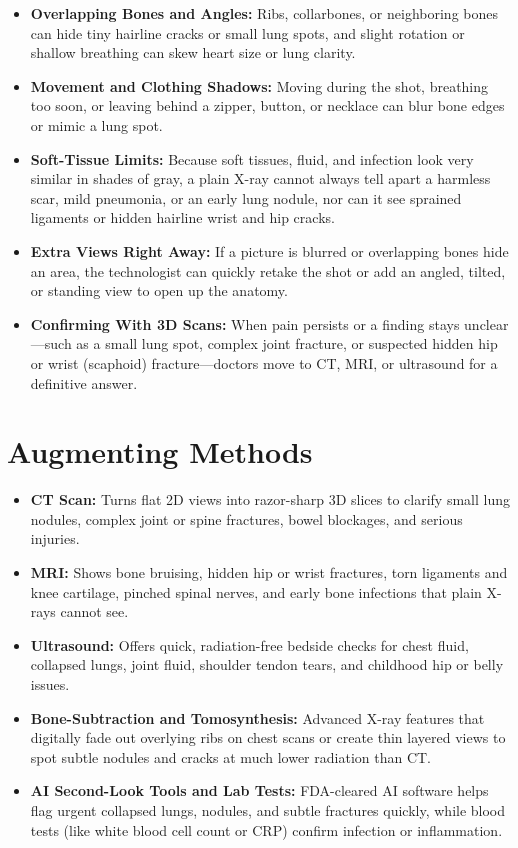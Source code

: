 \begin{itemize}
    \item \textbf{Overlapping Bones and Angles:} Ribs, collarbones, or neighboring bones can hide tiny hairline cracks or small lung spots, and slight rotation or shallow breathing can skew heart size or lung clarity.
    \item \textbf{Movement and Clothing Shadows:} Moving during the shot, breathing too soon, or leaving behind a zipper, button, or necklace can blur bone edges or mimic a lung spot.
    \item \textbf{Soft-Tissue Limits:} Because soft tissues, fluid, and infection look very similar in shades of gray, a plain X-ray cannot always tell apart a harmless scar, mild pneumonia, or an early lung nodule, nor can it see sprained ligaments or hidden hairline wrist and hip cracks.
    \item \textbf{Extra Views Right Away:} If a picture is blurred or overlapping bones hide an area, the technologist can quickly retake the shot or add an angled, tilted, or standing view to open up the anatomy.
    \item \textbf{Confirming With 3D Scans:} When pain persists or a finding stays unclear---such as a small lung spot, complex joint fracture, or suspected hidden hip or wrist (scaphoid) fracture---doctors move to CT, MRI, or ultrasound for a definitive answer.
\end{itemize}

\section{Augmenting Methods}

\begin{itemize}
    \item \textbf{CT Scan:} Turns flat 2D views into razor-sharp 3D slices to clarify small lung nodules, complex joint or spine fractures, bowel blockages, and serious injuries.
    \item \textbf{MRI:} Shows bone bruising, hidden hip or wrist fractures, torn ligaments and knee cartilage, pinched spinal nerves, and early bone infections that plain X-rays cannot see.
    \item \textbf{Ultrasound:} Offers quick, radiation-free bedside checks for chest fluid, collapsed lungs, joint fluid, shoulder tendon tears, and childhood hip or belly issues.
    \item \textbf{Bone-Subtraction and Tomosynthesis:} Advanced X-ray features that digitally fade out overlying ribs on chest scans or create thin layered views to spot subtle nodules and cracks at much lower radiation than CT.
    \item \textbf{AI Second-Look Tools and Lab Tests:} FDA-cleared AI software helps flag urgent collapsed lungs, nodules, and subtle fractures quickly, while blood tests (like white blood cell count or CRP) confirm infection or inflammation.
\end{itemize}

